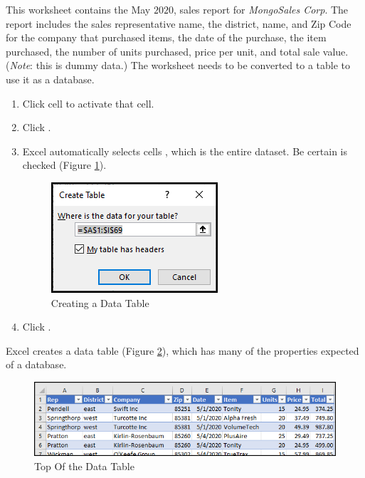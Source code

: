 This worksheet contains the May $ 2020 $, sales report for \textit{MongoSales Corp}. The report includes the sales representative name, the district, name, and Zip Code for the company that purchased items, the date of the purchase, the item purchased, the number of units purchased, price per unit, and total sale value. (\textit{Note}: this is dummy data.) The worksheet needs to be converted to a table to use it as a database.

\begin{enumbox}
	\begin{enumerate}
		\item Click cell  to activate that cell.
		\item Click .
		\item Excel automatically selects cells , which is the entire dataset. Be certain  is checked (Figure \ref{09:fig10}).
	
		\begin{figure}[H]
			\centering
			\includegraphics[width=\maxwidth{.50\linewidth}]{gfx/ch09_fig10}
			\caption{Creating a Data Table}
			\label{09:fig10}
		\end{figure}
		
		\item Click .
	\end{enumerate}
\end{enumbox}

Excel creates a data table (Figure \ref{09:fig11}), which has many of the properties expected of a database. 

\begin{figure}[H]
	\centering
	\includegraphics[width=\maxwidth{.95\linewidth}]{gfx/ch09_fig11}
	\caption{Top Of the Data Table}
	\label{09:fig11}
\end{figure}

